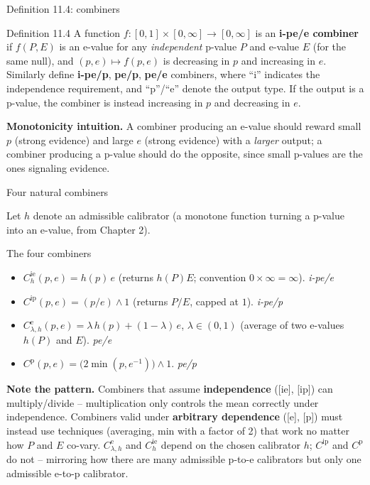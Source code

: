 \documentclass[aspectratio=169,10pt]{beamer}
\newcommand{\1}{\mathbb{1}}
\begin{document}
\begin{frame}[allowframebreaks]{Definition 11.4: combiners}

\begin{block}{Definition 11.4}
A function $f:[0,1]\times[0,\infty]\to[0,\infty]$ is an \textbf{i-pe/e combiner} if $f(P,E)$ is an e-value for any \emph{independent} p-value $P$ and e-value $E$ (for the same null), and $(p,e)\mapsto f(p,e)$ is decreasing in $p$ and increasing in $e$. Similarly define \textbf{i-pe/p}, \textbf{pe/p}, \textbf{pe/e} combiners, where ``i'' indicates the independence requirement, and ``p''/``e'' denote the output type. If the output is a p-value, the combiner is instead increasing in $p$ and decreasing in $e$.
\end{block}

\textbf{Monotonicity intuition.} A combiner producing an e-value should reward small $p$ (strong evidence) and large $e$ (strong evidence) with a \emph{larger} output; a combiner producing a p-value should do the opposite, since small p-values are the ones signaling evidence.

\end{frame}

\begin{frame}[allowframebreaks]{Four natural combiners}

Let $h$ denote an admissible calibrator (a monotone function turning a p-value into an e-value, from Chapter 2).

\begin{block}{The four combiners}
\begin{itemize}
\item[\textbf{[ie]}] $C^{\mathrm{ie}}_h(p,e) = h(p)\,e$ \quad (returns $h(P)E$; convention $0\times\infty=\infty$). \hfill \emph{i-pe/e}
\item[\textbf{[ip]}] $C^{\mathrm{ip}}(p,e) = (p/e)\wedge 1$ \quad (returns $P/E$, capped at $1$). \hfill \emph{i-pe/p}
\item[\textbf{[e]}] $C^{\mathrm{e}}_{\lambda,h}(p,e) = \lambda\,h(p) + (1-\lambda)\,e$, $\lambda\in(0,1)$ \quad (average of two e-values $h(P)$ and $E$). \hfill \emph{pe/e}
\item[\textbf{[p]}] $C^{\mathrm{p}}(p,e) = \bigl(2\min(p,e^{-1})\bigr)\wedge 1$. \hfill \emph{pe/p}
\end{itemize}
\end{block}

\textbf{Note the pattern.} Combiners that assume \textbf{independence} ([ie], [ip]) can multiply/divide -- multiplication only controls the mean correctly under independence. Combiners valid under \textbf{arbitrary dependence} ([e], [p]) must instead use techniques (averaging, min with a factor of 2) that work no matter how $P$ and $E$ co-vary. $C^{\mathrm{e}}_{\lambda,h}$ and $C^{\mathrm{ie}}_h$ depend on the chosen calibrator $h$; $C^{\mathrm{ip}}$ and $C^{\mathrm{p}}$ do not -- mirroring how there are many admissible p-to-e calibrators but only one admissible e-to-p calibrator.

\end{frame}
\end{document}
